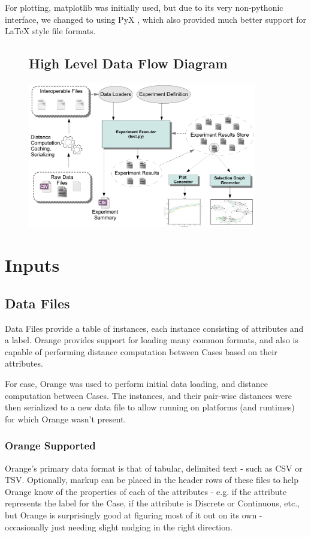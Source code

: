 \documentclass[a4paper,11pt]{report}
\begin{document}
For plotting, matplotlib \citep{prog:matplotlib} was initially used, but due to its very non-pythonic interface, we changed to using PyX \citep{prog:pyx}, which also provided much better support for \LaTeX{} style file formats.

\begin{figure}[h!]
\subsection{High Level Data Flow Diagram}
 \centering
\includegraphics[width=10cm]{./Drawn/DataFlowDiagram}
\end{figure}

\section{Inputs}
\subsection{Data Files}
Data Files provide a table of instances, each instance consisting of attributes and a label. Orange provides support for loading many common formats, and also is capable of performing distance computation between Cases based on their attributes.

For ease, Orange was used to perform initial data loading, and distance computation between Cases. The instances, and their pair-wise distances were then serialized to a new data file to allow running on platforms (and runtimes) for which Orange wasn't present.

\subsubsection{Orange Supported}
Orange's primary data format is that of tabular, delimited text - such as CSV or TSV. Optionally, markup can be placed in the header rows of these files to help Orange know of the properties of each of the attributes - e.g. if the attribute represents the label for the Case, if the attribute is Discrete or Continuous, etc., but Orange is surprisingly good at figuring most of it out on its own - occasionally just needing slight nudging in the right direction.
\end{document}
